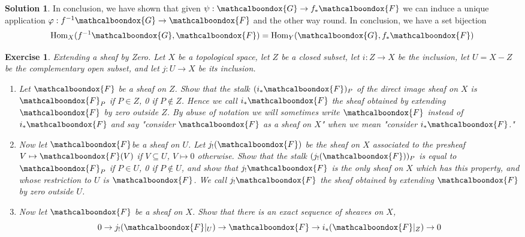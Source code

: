 \documentclass[12pt]{article}
\newtheorem{ex}{Exercise}[section]
\theoremstyle{definition}
\newtheorem*{sol}{Solution}
\newcommand{\sF}{\ensuremath{\mathcalboondox{F}}}
\newcommand{\sG}{\ensuremath{\mathcalboondox{G}}}
\begin{document}
\begin{sol}
	In conclusion, we have shown that given $\psi: \sG \to f_* \sF$ we can induce a unique application $\varphi: f^{-1}\sG \to \sF$ and the other way round. In conclusion, we have a set bijection 
	\[
		\mathrm{Hom}_X(f^{-1}\sG, \sF) = \mathrm{Hom}_Y(\sG, f_{*}\sF)
	\]

\end{sol}

\begin{ex}
	Extending a sheaf by Zero. Let $X$ be a topological space, let $Z$ be a closed subset, let $i: Z \to X$ be the inclusion, let $U = X-Z$ be the complementary open subset, and let $j: U \to X$ be its inclusion.

	\begin{enumerate}[label=\alph*)]
		\item Let $\sF$ be a sheaf on $Z$. Show that the stalk $(i_{*} \sF)_P$ of the direct image sheaf on $X$ is $\sF_P$ if $P \in Z$, 0 if $P \notin Z$. Hence we call $i_{*} \sF$ the sheaf obtained by extending $\sF$ by zero outside $Z$. By abuse of notation we will sometimes write $\sF$ instead of $i_{*}\sF$ and say "consider $\sF$ as a sheaf on $X$" when we mean "consider $i_{*} \sF$."

		\item Now let \sF be a sheaf on $U$. Let $j_{!}(\sF)$ be the sheaf on $X$ associated to the presheaf $V \mapsto \sF(V)$ if $V \subseteq U$, $V \mapsto 0$ otherwise. Show that the stalk $(j_{!}(\sF))_P$ is equal to $\sF_P$ if $P \in U$, 0 if $P \notin U$, and show that $j_{!}\sF$ is the only sheaf on $X$ which has this property, and whose restriction to $U$ is $\sF$. We call $j_{!}\sF$ the sheaf obtained by extending $\sF$ by zero outside $U$.

		\item Now let $\sF$ be a sheaf on $X$. Show that there is an exact sequence of sheaves on $X$,
		\[
			0 \to j_{!}(\sF|_{U}) \to \sF \to i_{*}(\sF|_{Z}) \to 0
		\]
	\end{enumerate}
\end{ex}
\end{document}
